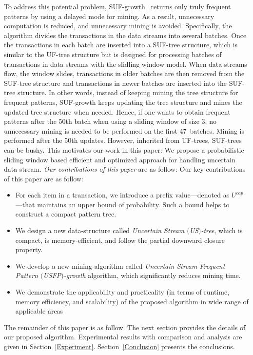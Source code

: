 \documentclass[10pt, conference, compsocconf]{IEEEtran}
\begin{document}
To address this potential problem, SUF-growth~\cite{DBLP:conf/icde/LeungH09} returns only truly frequent patterns by using a delayed mode for mining. As a result, unnecessary computation is reduced, and unnecessary mining is avoided. Specifically, the algorithm divides the transactions in the data streams into several batches. Once the transactions in each batch are inserted into a \mbox{SUF-tree} structure, which is similar to the UF-tree structure but is designed for processing batches of transactions in data streams with the slidling window model. When data streams flow, the window slides, transactions in older batches are then removed from the SUF-tree structure and transactions in newer batches are inserted into the SUF-tree structure. In other words, instead of keeping mining the tree structure for frequent patterns, SUF-growth keeps updating the tree structure and mines the updated tree structure when needed. Hence, if one wants to obtain frequent patterns after the 50th batch when using a sliding window of size 3, no unnecessary mining is needed to be performed on the first 47~batches. Mining is performed after the 50th updates. However, inherited from UF-trees, SUF-trees can be bushy. 
This motivates our work in this paper: We propose a probabilistic sliding window based efficient and optimized approach for handling uncertain data stream.
{\em Our contributions of this paper} are as follow:
Our key contributions of this paper are as follow:
\begin{itemize}
  \item For each item in a transaction, we introduce a prefix value---denoted as $U^{cap}$---that maintains an upper bound of probability. Such a bound helps to construct a compact pattern tree.
  \item We design a new data-structure called \emph{Uncertain Stream $($US$)$-tree}, which is compact,  is memory-efficient, and follow the partial downward closure property.
  \item We develop a new mining algorithm called \emph{Uncertain Stream Frequent Pattern $($USFP$)$-growth} algorithm, which significantly reduces mining time.
  \item We demonstrate the applicability and practicality (in terms of runtime, memory efficiency, and scalability) of the proposed algorithm in wide range of applicable areas
  \end{itemize}
The remainder of this paper is as follow. The next section provides the details of our proposed algorithm. Experimental results with comparison and analysis are given in Section~\ref{Experiment}. Section~\ref{Conclusion} presents the conclusions.
\end{document}
